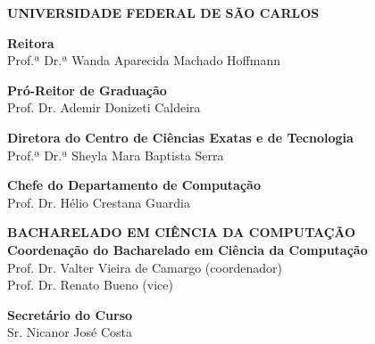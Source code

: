 \thispagestyle{empty}
\begin{center}
    \singlespacing
    \Large
\textbf{UNIVERSIDADE FEDERAL DE SÃO CARLOS}

\vspace{2ex}
\textbf{Reitora} \\
Prof.ª Dr.ª Wanda Aparecida Machado Hoffmann 

\vspace{2ex}
\textbf{Pró-Reitor de Graduação} \\
Prof. Dr. Ademir Donizeti Caldeira

\vspace{2ex}
\textbf{Diretora do Centro de Ciências Exatas e de Tecnologia} \\
Prof.ª Dr.ª Sheyla Mara Baptista Serra 

\vspace{2ex}
\textbf{Chefe do Departamento de Computação}\\
Prof. Dr. Hélio Crestana Guardia

\vspace{2ex}
\textbf{BACHARELADO EM CIÊNCIA DA COMPUTAÇÃO} \\

\vspace{2ex}
\textbf{Coordenação do Bacharelado em Ciência da Computação} \\
Prof. Dr. Valter Vieira de Camargo (coordenador) \\
Prof. Dr. Renato Bueno (vice)


%



\vspace{2ex}
\textbf{Secretário do Curso}\\
Sr. Nicanor José Costa


\end{center}
